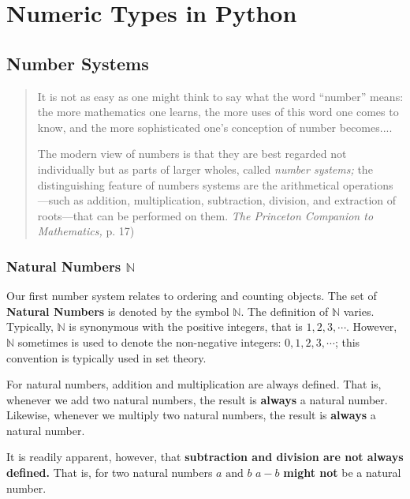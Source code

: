 \chapter{Numeric Types in Python}

\section{Number Systems}

\begin{quote}
    It is not as easy as one might think to say what the word ``number'' means: the more mathematics one learns, the more uses of this word one comes to know, and the more sophisticated one's conception of number becomes....

    The modern view of numbers is that they are best regarded not individually but as parts of  larger wholes, called \emph{number systems;} the distinguishing feature of numbers systems are the arithmetical operations---such as addition, multiplication, subtraction, division, and extraction of roots---that can be performed on them. \emph{The Princeton Companion to Mathematics,} p. 17)
\end{quote}

\subsection{Natural Numbers $\mathbb{N}$}

Our first number system relates to ordering and counting objects. The set of \textbf{Natural Numbers} is denoted by the symbol $\mathbb{N}$. The definition of $\mathbb{N}$ varies. Typically, $\mathbb{N}$ is synonymous with the positive integers, that is $1,2,3,\cdots$. However, $\mathbb{N}$ sometimes is used to denote the non-negative integers: $0,1,2,3,\cdots$; this convention is typically used in set theory.

For natural numbers, addition and multiplication are always defined. That is, whenever we add two natural numbers, the result is \textbf{always} a natural number. Likewise, whenever we multiply two natural numbers, the result is \textbf{always} a natural number.

It is readily apparent, however, that \textbf{subtraction and division are not always defined.} That is, for two natural numbers $a \text{ and } b$ $a-b$ \textbf{might not} be a natural number.

\subsubsection{}


